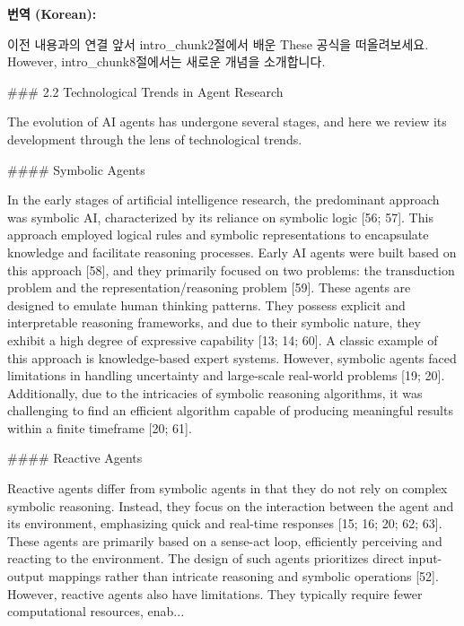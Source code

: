 \documentclass[12pt,a4paper]{article}
\begin{document}
\begin{mdframed}[style=ko]
\noindent\textbf{\small 번역 (Korean):}\\[2pt]
\begin{linkbox}{이전 내용과의 연결}
  앞서 intro_chunk2절에서 배운 These 공식을 떠올려보세요. However, intro_chunk8절에서는 새로운 개념을 소개합니다.
\end{linkbox}
### 2.2 Technological Trends in Agent Research

The evolution of AI agents has undergone several stages, and here we review its development through the lens of technological trends.

#### Symbolic Agents

In the early stages of artificial intelligence research, the predominant approach was symbolic AI, characterized by its reliance on symbolic logic [56; 57]. This approach employed logical rules and symbolic representations to encapsulate knowledge and facilitate reasoning processes. Early AI agents were built based on this approach [58], and they primarily focused on two problems: the transduction problem and the representation/reasoning problem [59]. These agents are designed to emulate human thinking patterns. They possess explicit and interpretable reasoning frameworks, and due to their symbolic nature, they exhibit a high degree of expressive capability [13; 14; 60]. A classic example of this approach is knowledge-based expert systems. However, symbolic agents faced limitations in handling uncertainty and large-scale real-world problems [19; 20]. Additionally, due to the intricacies of symbolic reasoning algorithms, it was challenging to find an efficient algorithm capable of producing meaningful results within a finite timeframe [20; 61].

#### Reactive Agents

Reactive agents differ from symbolic agents in that they do not rely on complex symbolic reasoning. Instead, they focus on the interaction between the agent and its environment, emphasizing quick and real-time responses [15; 16; 20; 62; 63]. These agents are primarily based on a sense-act loop, efficiently perceiving and reacting to the environment. The design of such agents prioritizes direct input-output mappings rather than intricate reasoning and symbolic operations [52]. However, reactive agents also have limitations. They typically require fewer computational resources, enab...
\end{mdframed}
\vspace{1em}
\end{document}
